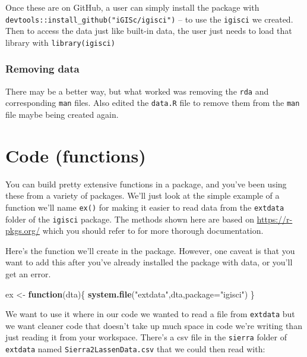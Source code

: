 \documentclass[
]{book}
\newenvironment{Shaded}{\begin{snugshade}}{\end{snugshade}}
\newcommand{\AttributeTok}[1]{\textcolor[rgb]{0.27,0.27,0.27}{#1}}
\newcommand{\ControlFlowTok}[1]{\textcolor[rgb]{0.27,0.27,0.27}{\textbf{#1}}}
\newcommand{\FunctionTok}[1]{\textcolor[rgb]{0.27,0.27,0.27}{\textbf{#1}}}
\newcommand{\NormalTok}[1]{#1}
\newcommand{\OtherTok}[1]{\textcolor[rgb]{0.37,0.37,0.37}{#1}}
\newcommand{\StringTok}[1]{\textcolor[rgb]{0.5,0.5,0.5}{#1}}
\begin{document}
Once these are on GitHub, a user can simply install the package with \texttt{devtools::install\_github("iGISc/igisci")} -- to use the \texttt{igisci} we created. Then to access the data just like built-in data, the user just needs to load that library with \texttt{library(igisci)}

\hypertarget{removing-data}{%
\subsubsection{Removing data}\label{removing-data}}

There may be a better way, but what worked was removing the \texttt{rda} and corresponding \texttt{man} files. Also edited the \texttt{data.R} file to remove them from the \texttt{man} file maybe being created again.

\hypertarget{code-functions}{%
\section{Code (functions)}\label{code-functions}}

You can build pretty extensive functions in a package, and you've been using these from a variety of packages. We'll just look at the simple example of a function we'll name \texttt{ex()} for making it easier to read data from the \texttt{extdata} folder of the \texttt{igisci} package. The methods shown here are based on \url{https://r-pkgs.org/} which you should refer to for more thorough documentation.

Here's the function we'll create in the package. However, one caveat is that you want to add this after you've already installed the package with data, or you'll get an error.

\begin{Shaded}
\begin{Highlighting}[]
\NormalTok{ex }\OtherTok{\textless{}{-}} \ControlFlowTok{function}\NormalTok{(dta)\{}
  \FunctionTok{system.file}\NormalTok{(}\StringTok{"extdata"}\NormalTok{,dta,}\AttributeTok{package=}\StringTok{"igisci"}\NormalTok{)}
\NormalTok{  \}}
\end{Highlighting}
\end{Shaded}

We want to use it where in our code we wanted to read a file from \texttt{extdata} but we want cleaner code that doesn't take up much space in code we're writing than just reading it from your workspace. There's a csv file in the \texttt{sierra} folder of \texttt{extdata} named \texttt{Sierra2LassenData.csv} that we could then read with:
\end{document}
